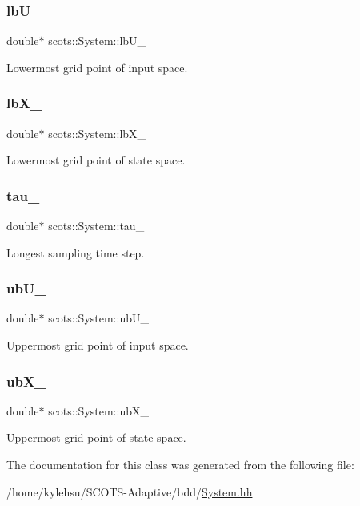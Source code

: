 \subsubsection{\texorpdfstring{lb\+U\+\_\+}{lbU\_}}
{\footnotesize\ttfamily double$\ast$ scots\+::\+System\+::lb\+U\+\_\+}

Lowermost grid point of input space. \mbox{\label{classscots_1_1System_a174089fcded761ebd6ec04ba1ef86bb7}} 
\subsubsection{\texorpdfstring{lb\+X\+\_\+}{lbX\_}}
{\footnotesize\ttfamily double$\ast$ scots\+::\+System\+::lb\+X\+\_\+}

Lowermost grid point of state space. \mbox{\label{classscots_1_1System_afbd67f26ca2f55a252399cbf6e59bdb7}} 
\subsubsection{\texorpdfstring{tau\+\_\+}{tau\_}}
{\footnotesize\ttfamily double$\ast$ scots\+::\+System\+::tau\+\_\+}

Longest sampling time step. \mbox{\label{classscots_1_1System_a722fea2f6aa331c64310f56ef32a88ba}} 
\subsubsection{\texorpdfstring{ub\+U\+\_\+}{ubU\_}}
{\footnotesize\ttfamily double$\ast$ scots\+::\+System\+::ub\+U\+\_\+}

Uppermost grid point of input space. \mbox{\label{classscots_1_1System_a89f05478d60c393b427231f255b3f7c7}} 
\subsubsection{\texorpdfstring{ub\+X\+\_\+}{ubX\_}}
{\footnotesize\ttfamily double$\ast$ scots\+::\+System\+::ub\+X\+\_\+}

Uppermost grid point of state space. 

The documentation for this class was generated from the following file\+:\begin{DoxyCompactItemize}
\item 
/home/kylehsu/\+S\+C\+O\+T\+S-\/\+Adaptive/bdd/\hyperlink{System_8hh}{System.\+hh}\end{DoxyCompactItemize}
